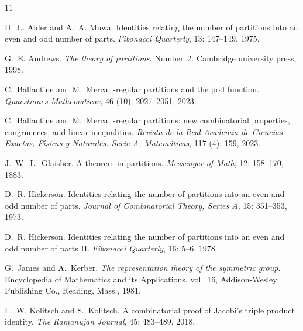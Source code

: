 \documentclass[12pt,reqno]{amsart}
\numberwithin{equation}{section}
\begin{document}
\begin{thebibliography}{11}






H.~L. Alder and A.~A. Muwa.
\newblock Identities relating the number of partitions into an even and odd number of parts.
\newblock \emph{Fibonacci Quarterly}, 13: 147--149, 1975.	

G.~E. Andrews.
\newblock \emph{The theory of partitions}.
\newblock Number~2. Cambridge university press, 1998.

C.~Ballantine and M.~Merca.
-regular partitions and the pod function.
\newblock \emph{Quaestiones Mathematicae}, 46 (10): 2027--2051, 2023{}.

C.~Ballantine and M.~Merca.
-regular partitions: new combinatorial properties, congruences, and linear inequalities.
\newblock \emph{Revista de la Real Academia de Ciencias Exactas, F{\'\i}sicas y Naturales. Serie A. Matem{\'a}ticas}, 117 (4): 159, 2023{}.

J.~W.~L.~Glaisher.
\newblock A theorem in partitions.
\newblock \emph{Messenger of Math}, 12: 158--170, 1883.	

D.~R. Hickerson.
\newblock Identities relating the number of partitions into an even and odd number of parts.
\newblock \emph{Journal of Combinatorial Theory, Series A}, 15: 351--353, 1973.

D.~R. Hickerson.
\newblock Identities relating the number of partitions into an even and odd number of parts {II}.
\newblock \emph{Fibonacci Quarterly}, 16: 5--6, 1978.

G.~James and A.~Kerber.
\newblock \emph{The representation theory of the symmetric group}.
\newblock Encyclopedia of Mathematics and its Applications, vol.~16, Addison-Wesley Publishing Co., Reading, Mass., 1981.

L.~W. Kolitsch and S.~Kolitsch.
\newblock A combinatorial proof of Jacobi’s triple product identity.
\newblock \emph{The Ramanujan Journal}, 45: 483--489, 2018.


\end{thebibliography}
\end{document}
